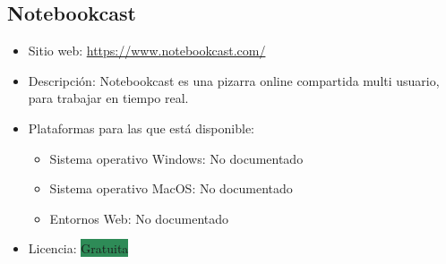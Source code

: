 \documentclass[11pt]{article}
\newcommand{\nodoc}{No documentado}
\newcommand{\gratis}{\colorbox{SeaGreen}{Gratuita}}
\begin{document}
\subsection{Notebookcast}

\begin{itemize}
\item Sitio web: \url{https://www.notebookcast.com/}
\item Descripción: Notebookcast es una pizarra online compartida multi usuario, para trabajar en tiempo real.
\item Plataformas para las que está disponible:
  \begin{itemize}
  \item Sistema operativo Windows: \nodoc
  \item Sistema operativo MacOS: \nodoc
  \item Entornos Web: \nodoc
  \end{itemize}
\item Licencia: \gratis
\end{itemize}
\end{document}
